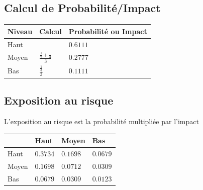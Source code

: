 \documentclass[11pt]{article}
\begin{document}
\begin{appendices}
\subsection{Calcul de Probabilité/Impact}

\begin{table}[H]
  \begin{center}
    \begin{tabu} to 0.5\linewidth {X[m]X[c,m]X[r,m]}
      \textbf{Niveau} & \textbf{Calcul} & \textbf{Probabilité ou Impact} \\
      \hline
      Haut  &  & $0.6111$\\
      Moyen & $\frac{\frac{1}{2} +\frac{1}{3}}{3}$                  & $0.2777$\\
      Bas   & $\frac{\frac{1}{3}}{3}$                               & $0.1111$\\
    \end{tabu}
  \end{center}
\end{table}

\subsection{Exposition au risque}
L'exposition au risque est la probabilité multipliée par l'impact

\begin{table}[H]
  \begin{center}
    \begin{tabu} to 0.7\linewidth {X[1]|X[1]|X[1]|X[1]}
      & \textbf{Haut}     & \textbf{Moyen}    & \textbf{Bas} \\
      \hline
      Haut    & $0.3734$ & $0.1698$ & $0.0679$\\
      \hline
      Moyen   & $0.1698$ & $0.0712$ & $0.0309$\\
      \hline
      Bas     & $0.0679$ & $0.0309$ & $0.0123$\\
    \end{tabu}
  \end{center}
\end{table}


\end{appendices}
\end{document}
